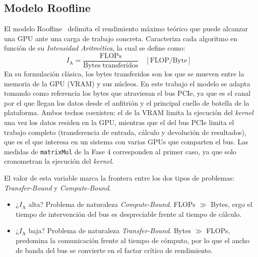 \documentclass[a4paper,11pt]{article}
\begin{document}
\subsection{Modelo Roofline}\label{sec:roofline}

El modelo Roofline~\cite{williams2009} delimita el rendimiento máximo teórico que puede alcanzar una GPU ante una carga de trabajo concreta.
Caracteriza cada algoritmo en función de su \textit{Intensidad Aritmética}, la cual se define como:
\begin{equation}\label{eq:intensidad}
    I_{\text{A}} = \frac{\text{FLOPs}}{\text{Bytes transferidos}} \quad \left[\text{FLOP/Byte}\right]
\end{equation}
En su formulación clásica, los bytes transferidos son los que se mueven entre la memoria de la GPU (VRAM) y sus núcleos.
En este trabajo el modelo se adapta tomando como referencia los bytes que atraviesan el bus PCIe, ya que es el canal por el
que llegan los datos desde el anfitrión y el principal cuello de botella de la plataforma.
Ambos techos coexisten: el de la VRAM limita la ejecución del \textit{kernel} una vez los datos residen en la GPU, mientras
que el del bus PCIe limita el trabajo completo (transferencia de entrada, cálculo y devolución de resultados), que es el
que interesa en un sistema con varias GPUs que comparten el bus. Las medidas de \texttt{matrixMul} de la Fase 4
corresponden al primer caso, ya que solo cronometran la ejecución del \textit{kernel}.

El valor de esta variable marca la frontera entre los dos tipos de problemas: \textit{Transfer-Bound} y \textit{Compute-Bound}.

\begin{itemize}[leftmargin=*,noitemsep,topsep=2pt]
    \item ¿$I_{\text{A}}$ alta? Problema de naturaleza \textit{Compute-Bound}. FLOPs $\gg$ Bytes, ergo el tiempo de
    intervención del bus es despreciable frente al tiempo de cálculo.
    \item ¿$I_{\text{A}}$ baja? Problema de naturaleza \textit{Transfer-Bound}. Bytes $\gg$ FLOPs, predomina la
    comunicación frente al tiempo de cómputo, por lo que el ancho de banda del bus se convierte en el factor crítico
    de rendimiento.
\end{itemize}
\end{document}
